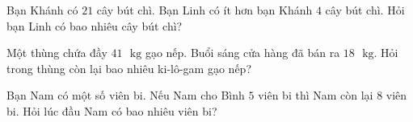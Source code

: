 \begin{bt}[1,5 điểm]
Bạn Khánh có $21$ cây bút chì. Bạn Linh có ít hơn bạn Khánh $4$ cây bút chì. Hỏi bạn Linh có bao nhiêu cây bút chì?
\end{bt}

\begin{bt}[1,0 điểm]
Một thùng chứa đầy $41\text{ }\text{kg}$ gạo nếp. Buổi sáng cửa hàng đã bán ra $18\text{ }\text{kg}$. Hỏi trong thùng còn lại bao nhiêu ki-lô-gam gạo nếp?
\end{bt}

\begin{bt}[1,0 điểm]
Bạn Nam có một số viên bi. Nếu Nam cho Bình $5$ viên bi thì Nam còn lại $8$ viên bi. Hỏi lúc đầu Nam có bao nhiêu viên bi?
\end{bt}
